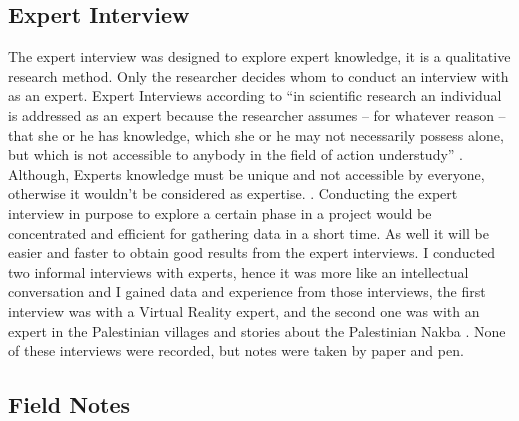 \subsection{Expert Interview}
The expert interview was designed to explore expert knowledge, it is a qualitative research method. Only the researcher decides whom to conduct an interview with as an expert. Expert Interviews according to \cite{Christmann2016}  “in scientific research an individual is addressed as an expert because the researcher assumes – for whatever reason – that she or he has knowledge, which she or he may not necessarily possess alone, but which is not accessible to anybody in the field of action understudy” \cite[p.18]{Christmann2016}. Although, Experts knowledge must be unique and not accessible by everyone, otherwise it wouldn't be considered as expertise.  \cite[p.221]{Christmann2016}. Conducting the expert interview in purpose to explore a certain phase in a project would be concentrated and efficient for gathering data in a short time. As well it will be easier and faster to obtain good results from the expert interviews. I conducted two informal interviews with experts, hence it was more like an intellectual conversation and I gained data and experience from those interviews, the first interview was with a Virtual Reality expert, and the second one was with an expert in the Palestinian villages and stories about the Palestinian Nakba . None of these interviews were recorded, but notes were taken by paper and pen. 

\subsection{Field Notes}

